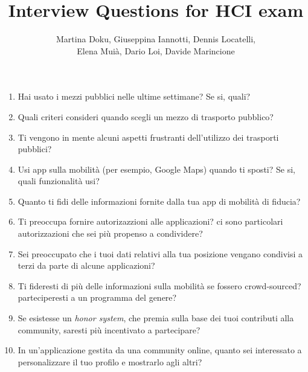 \documentclass[a4paper, 12pt]{article}
\title{\Huge Interview Questions for HCI exam}
\author{Martina Doku, Giuseppina Iannotti, Dennis Locatelli,\\Elena Muià, Dario Loi, Davide Marincione}
\begin{document}
    \maketitle
    \begin{enumerate}
        \item Hai usato i mezzi pubblici nelle ultime settimane? Se si, quali?
        \item Quali criteri consideri quando scegli un mezzo di trasporto pubblico?
        \item Ti vengono in mente alcuni aspetti frustranti dell'utilizzo dei trasporti pubblici? 
        \item Usi app sulla mobilità (per esempio, Google Maps) quando ti sposti? Se si, quali funzionalità usi?
        \item Quanto ti fidi delle informazioni fornite dalla tua app di mobilità di fiducia?
        \item Ti preoccupa fornire autorizazzioni alle applicazioni? ci sono particolari autorizzazioni che sei più 
            propenso a condividere?
        \item Sei preoccupato che i tuoi dati relativi alla tua posizione vengano condivisi a terzi da parte di 
            alcune applicazioni?
        \item Ti fideresti di più delle informazioni sulla mobilità se fossero crowd-sourced? parteciperesti a un
            programma del genere?
        \item Se esistesse un \emph{honor system}, che premia sulla base dei tuoi contributi alla community, saresti più incentivato 
            a partecipare?
        \item In un'applicazione gestita da una community online, quanto sei interessato a personalizzare il tuo profilo e 
            mostrarlo agli altri?
    \end{enumerate}
\end{document}
